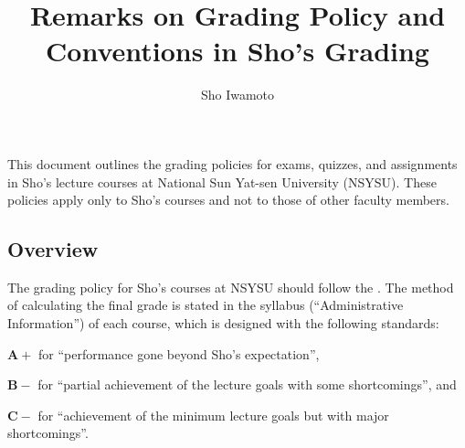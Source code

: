 \documentclass[11pt,pdfa,lastpage,minititle]{MishoNote}
\title{Remarks on Grading Policy and Conventions in Sho's Grading}
\author{Sho Iwamoto}
\begin{document}
\maketitle

This document outlines the grading policies for exams, quizzes, and assignments in Sho's lecture courses at National Sun Yat-sen University (NSYSU).
These policies apply only to Sho’s courses and not to those of other faculty members.

\subsection*{Overview}
The grading policy for Sho's courses at NSYSU should follow the .
The method of calculating the final grade is stated in the syllabus (``Administrative Information'') of each course, which is designed with the following standards:
\begin{miniitemize}
  \item $\mathbfup{A+}$ for ``performance gone beyond Sho's expectation'',
  \item $\mathbfup{B-}$ for ``partial achievement of the lecture goals with some shortcomings'', and
  \item $\mathbfup{C-}$ for ``achievement of the minimum lecture goals but with major shortcomings''.
\end{miniitemize}
\OutputNote
\end{document}
